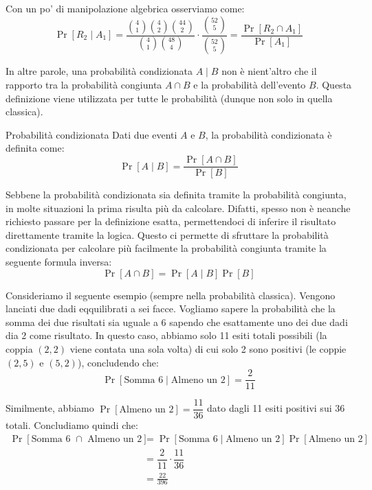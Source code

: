 \documentclass[a4paper, 12pt]{report}
\begin{document}
    Con un po' di manipolazione algebrica osserviamo come:
    \[\Pr[R_2 \mid A_1] = \frac{\binom{4}{1} \binom{4}{2} \binom{44}{2}}{\binom{4}{1} \binom{48}{4}} \cdot \frac{\binom{52}{5}}{\binom{52}{5}} = \frac{\Pr[R_2 \cap A_1]}{\Pr[A_1]}\]

    In altre parole, una probabilità condizionata $A \mid B$ non è nient'altro che il rapporto tra la probabilità congiunta $A \cap B$ e la probabilità dell'evento $B$. Questa definizione viene utilizzata per tutte le probabilità (dunque non solo in quella classica).

    \begin{frameddefn}{Probabilità condizionata}
        Dati due eventi $A$ e $B$, la probabilità condizionata  è definita come:
        \[\Pr[A \mid B] = \frac{\Pr[A \cap B]}{\Pr[B]}\]
    \end{frameddefn}

    Sebbene la probabilità condizionata sia definita tramite la probabilità congiunta, in molte situazioni la prima risulta più  da calcolare. Difatti, spesso non è neanche richiesto passare per la definizione esatta, permettendoci di inferire il risultato direttamente tramite la logica. Questo ci permette di sfruttare la probabilità condizionata per calcolare più facilmente la probabilità congiunta tramite la seguente formula inversa:
    \[\Pr[A \cap B] = \Pr[A \mid B] \Pr[B]\]

    Consideriamo il seguente esempio (sempre nella probabilità classica). Vengono lanciati due dadi eqquilibrati a sei facce. Vogliamo sapere la probabilità che la somma dei due risultati sia uguale a 6 sapendo che esattamente uno dei due dadi dia 2 come risultato. In questo caso, abbiamo solo 11 esiti totali possibili (la coppia $(2,2)$ viene contata una sola volta) di cui solo 2 sono positivi (le coppie $(2,5)$ e $(5,2)$), concludendo che:
    \[\Pr[\text{Somma 6} \mid \text{Almeno un 2}] = \dfrac{2}{11}\]

    Similmente, abbiamo $\Pr[\text{Almeno un 2}] = \dfrac{11}{36}$ dato dagli 11 esiti positivi sui 36 totali. Concludiamo quindi che:
    \[\begin{split}
        \Pr[\text{Somma 6 } \cap \text{ Almeno un 2}] &= \Pr[\text{Somma 6} \mid \text{Almeno un 2}] \Pr[\text{Almeno un 2}] \\
        &= \dfrac{2}{11} \cdot \dfrac{11}{36} \\
        &= \frac{22}{396}
    \end{split}\]
\end{document}
